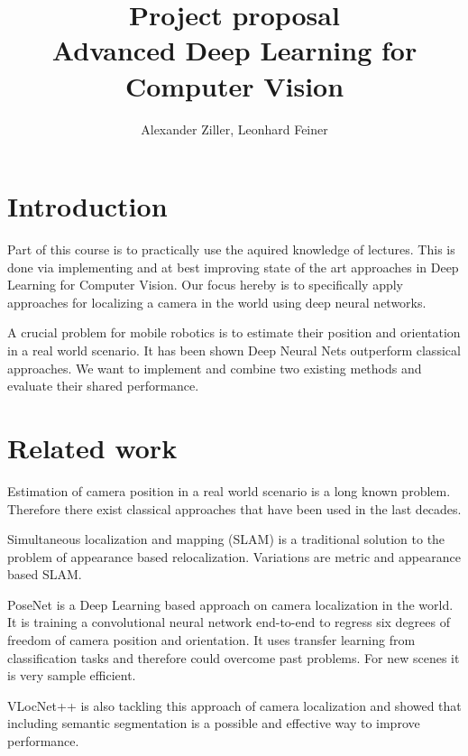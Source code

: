 \documentclass[11pt,twocolumn,letterpaper]{article}
\begin{document}
\title{Project proposal\\Advanced Deep Learning for Computer Vision}
\author{Alexander Ziller, Leonhard Feiner}
\date{}
\maketitle	

\section{Introduction}
Part of this course is to practically use the aquired knowledge of lectures. This is done via implementing and at best improving state of the art approaches in Deep Learning for Computer Vision. Our focus hereby is to specifically apply approaches for localizing a camera in the world using deep neural networks.

A crucial problem for mobile robotics is to estimate their position and orientation in a real world scenario. It has been shown Deep Neural Nets outperform classical approaches. We want to implement and combine two existing methods and evaluate their shared performance.

\section{Related work}
Estimation of camera position in a real world scenario is a long known problem. Therefore there exist classical approaches that have been used in the last decades. 

Simultaneous localization and mapping (SLAM) is a traditional solution to the problem of appearance based relocalization. Variations are metric and appearance based SLAM. %

PoseNet \cite{kendall2015posenet} is a Deep Learning based approach on camera localization in the world. It is training a convolutional neural network end-to-end to regress six degrees of freedom of camera position and orientation. It uses transfer learning from classification tasks and therefore could overcome past problems. For new scenes it is very sample efficient.

VLocNet++ \cite{vlocnet} is also tackling this approach of camera localization and showed that including semantic segmentation is a possible and effective way to improve performance.
\end{document}
